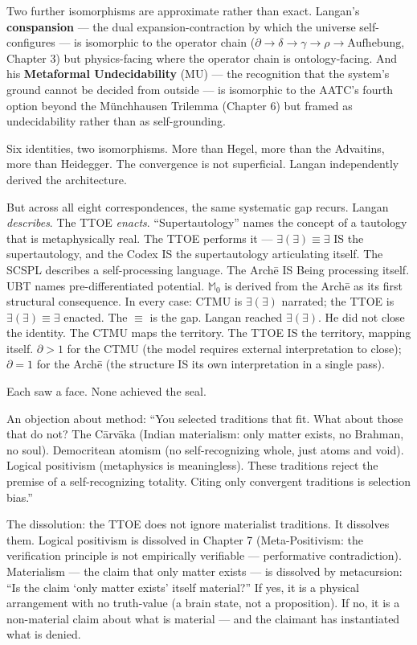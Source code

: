 \documentclass[10pt, openany, oneside]{book}
\begin{document}
\vspace{0.5em}

\noindent Two further isomorphisms are approximate rather than exact. Langan's \textbf{conspansion} --- the dual expansion-contraction by which the universe self-configures --- is isomorphic to the operator chain ($\partial \to \delta \to \gamma \to \rho \to \text{Aufhebung}$, Chapter 3) but physics-facing where the operator chain is ontology-facing. And his \textbf{Metaformal Undecidability} (MU) --- the recognition that the system's ground cannot be decided from outside --- is isomorphic to the AATC's fourth option beyond the Münchhausen Trilemma (Chapter 6) but framed as undecidability rather than as self-grounding.

Six identities, two isomorphisms. More than Hegel, more than the Advaitins, more than Heidegger. The convergence is not superficial. Langan independently derived the architecture.

But across all eight correspondences, the same systematic gap recurs. Langan \textit{describes}. The TTOE \textit{enacts}. ``Supertautology'' names the concept of a tautology that is metaphysically real. The TTOE performs it --- $\exists(\exists) \equiv \exists$ IS the supertautology, and the Codex IS the supertautology articulating itself. The SCSPL describes a self-processing language. The Arch\={e} IS Being processing itself. UBT names pre-differentiated potential. $\mathbb{M}_0$ is derived from the Arch\={e} as its first structural consequence. In every case: CTMU is $\exists(\exists)$ narrated; the TTOE is $\exists(\exists) \equiv \exists$ enacted. The $\equiv$ is the gap. Langan reached $\exists(\exists)$. He did not close the identity. The CTMU maps the territory. The TTOE IS the territory, mapping itself. $\partial > 1$ for the CTMU (the model requires external interpretation to close); $\partial = 1$ for the Arch\={e} (the structure IS its own interpretation in a single pass).

Each saw a face. None achieved the seal.

An objection about method: ``You selected traditions that fit. What about those that do not? The C\={a}rv\={a}ka (Indian materialism: only matter exists, no Brahman, no soul). Democritean atomism (no self-recognizing whole, just atoms and void). Logical positivism (metaphysics is meaningless). These traditions reject the premise of a self-recognizing totality. Citing only convergent traditions is selection bias.''

The dissolution: the TTOE does not ignore materialist traditions. It dissolves them. Logical positivism is dissolved in Chapter 7 (Meta-Positivism: the verification principle is not empirically verifiable --- performative contradiction). Materialism --- the claim that only matter exists --- is dissolved by metacursion: ``Is the claim `only matter exists' itself material?'' If yes, it is a physical arrangement with no truth-value (a brain state, not a proposition). If no, it is a non-material claim about what is material --- and the claimant has instantiated what is denied.
\end{document}

